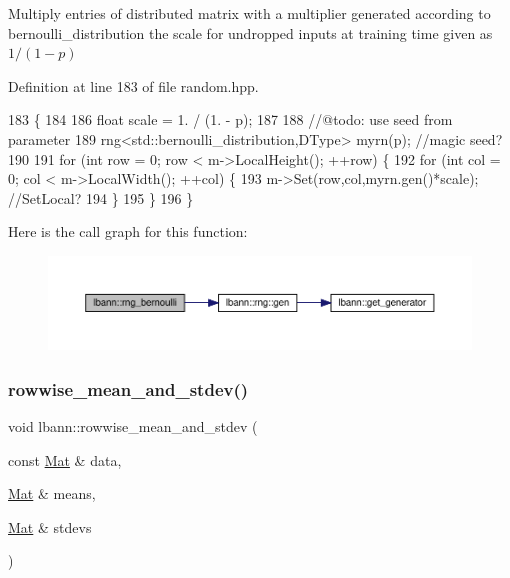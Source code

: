 Multiply entries of distributed matrix with a multiplier generated according to bernoulli\+\_\+distribution the scale for undropped inputs at training time given as $ 1 / (1 - p) $ 

Definition at line 183 of file random.\+hpp.


\begin{DoxyCode}
183                                               \{
184 
186   \textcolor{keywordtype}{float} scale = 1. / (1. - p);
187 
188   \textcolor{comment}{//@todo: use seed from parameter}
189   rng<std::bernoulli\_distribution,DType> myrn(p); \textcolor{comment}{//magic seed?}
190 
191   \textcolor{keywordflow}{for} (\textcolor{keywordtype}{int} row = 0; row < m->LocalHeight(); ++row) \{
192     \textcolor{keywordflow}{for} (\textcolor{keywordtype}{int} col = 0; col < m->LocalWidth(); ++col) \{
193       m->Set(row,col,myrn.gen()*scale); \textcolor{comment}{//SetLocal?}
194     \}
195   \}
196 \}
\end{DoxyCode}
Here is the call graph for this function\+:\nopagebreak
\begin{figure}[H]
\begin{center}
\leavevmode
\includegraphics[width=350pt]{namespacelbann_a481f0c268c74d3ec8b81861472559870_cgraph}
\end{center}
\end{figure}
\mbox{\label{namespacelbann_a0c713b77f8e191addc1e0210037f9e5f}} 
\subsubsection{\texorpdfstring{rowwise\+\_\+mean\+\_\+and\+\_\+stdev()}{rowwise\_mean\_and\_stdev()}\hspace{0.1cm}{\footnotesize\ttfamily [1/2]}}
{\footnotesize\ttfamily void lbann\+::rowwise\+\_\+mean\+\_\+and\+\_\+stdev (\begin{DoxyParamCaption}\item[{const \hyperlink{base_8hpp_a68f11fdc31b62516cb310831bbe54d73}{Mat} \&}]{data,  }\item[{\hyperlink{base_8hpp_a68f11fdc31b62516cb310831bbe54d73}{Mat} \&}]{means,  }\item[{\hyperlink{base_8hpp_a68f11fdc31b62516cb310831bbe54d73}{Mat} \&}]{stdevs }\end{DoxyParamCaption})}



